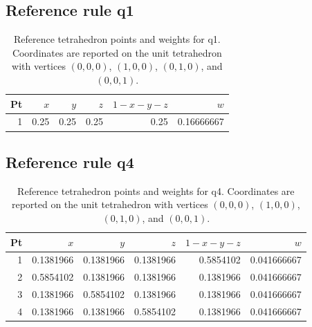 \subsection*{Reference rule q1}
\scriptsize
\begin{table}[H]
\centering
\caption{Reference tetrahedron points and weights for q1. Coordinates are reported on the unit tetrahedron with vertices $(0,0,0)$, $(1,0,0)$, $(0,1,0)$, and $(0,0,1)$.}
\begin{tabular}{@{}rrrrrr@{}}
\toprule
Pt & $x$ & $y$ & $z$ & $1-x-y-z$ & $w$ \\
\midrule
1 & 0.25 & 0.25 & 0.25 & 0.25 & 0.16666667 \\
\bottomrule
\end{tabular}
\end{table}
\normalsize

\subsection*{Reference rule q4}
\scriptsize
\begin{table}[H]
\centering
\caption{Reference tetrahedron points and weights for q4. Coordinates are reported on the unit tetrahedron with vertices $(0,0,0)$, $(1,0,0)$, $(0,1,0)$, and $(0,0,1)$.}
\begin{tabular}{@{}rrrrrr@{}}
\toprule
Pt & $x$ & $y$ & $z$ & $1-x-y-z$ & $w$ \\
\midrule
1 & 0.1381966 & 0.1381966 & 0.1381966 & 0.5854102 & 0.041666667 \\
2 & 0.5854102 & 0.1381966 & 0.1381966 & 0.1381966 & 0.041666667 \\
3 & 0.1381966 & 0.5854102 & 0.1381966 & 0.1381966 & 0.041666667 \\
4 & 0.1381966 & 0.1381966 & 0.5854102 & 0.1381966 & 0.041666667 \\
\bottomrule
\end{tabular}
\end{table}
\normalsize

